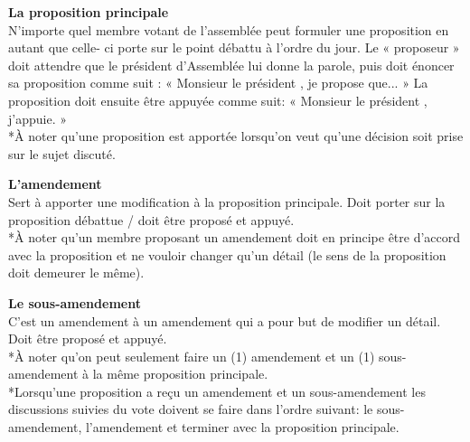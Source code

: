 \begin{multicols}{2}
\bigskip
\noindent
\textbf{La proposition principale}\\
N'importe quel membre votant de l'assemblée peut formuler une proposition en autant que celle-
ci porte sur le point débattu à l'ordre du jour. Le « proposeur » doit attendre que le président d'Assemblée lui donne la parole, puis doit énoncer sa proposition comme suit : « Monsieur le président , je propose que... » La proposition doit ensuite être appuyée comme suit: « Monsieur le président , j'appuie. »\\
*À noter qu'une proposition est apportée lorsqu'on veut qu'une décision soit prise sur le sujet discuté.

\bigskip
\noindent
\textbf{L'amendement}\\
Sert à apporter une modification à la proposition principale. Doit porter sur la proposition débattue / doit être proposé et appuyé.\\
*À noter qu'un membre proposant un amendement doit en principe être d'accord avec la proposition et ne vouloir changer qu'un détail (le sens de la proposition doit demeurer le même).

\bigskip
\noindent
\textbf{Le sous-amendement}\\ 
C'est un amendement à un amendement qui a pour but de modifier un détail. Doit être proposé et appuyé.\\
*À noter qu'on peut seulement faire un (1) amendement et un (1) sous-amendement à la 
même proposition principale.\\
*Lorsqu'une proposition a reçu un amendement et un sous-amendement les discussions suivies 
du vote doivent se faire dans l'ordre suivant: le sous-amendement, l'amendement et terminer 
avec la proposition principale.
\end{multicols}
\newpage
